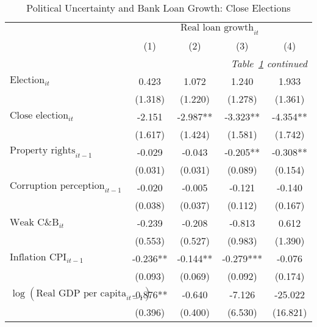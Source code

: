 \begin{longtable}{m{8cm}*{4}{c}}                                         \caption{Political Uncertainty and Bank Loan Growth: Close Elections \label{celoans}}\\                                         \toprule                                         &\multicolumn{4}{c}{$\text{Real loan growth}_{it}$} \\ \cmidrule(lr){2-5}
                    &         (1)   &         (2)   &         (3)   &         (4)   \\
\midrule\endfirsthead                                         \multicolumn{5}{r}{\textit{Table~\ref{celoans} continued}} \\                                         \toprule\endhead\midrule\endfoot\endlastfoot
$\text{Election}_{it}$&       0.423   &       1.072   &       1.240   &       1.933   \\
                    &     (1.318)   &     (1.220)   &     (1.278)   &     (1.361)   \\
$\text{Close election}_{it}$&      -2.151   &      -2.987** &      -3.323** &      -4.354** \\
                    &     (1.617)   &     (1.424)   &     (1.581)   &     (1.742)   \\
$\text{Property rights}_{it-1}$&      -0.029   &      -0.043   &      -0.205** &      -0.308** \\
                    &     (0.031)   &     (0.031)   &     (0.089)   &     (0.154)   \\
$\text{Corruption perception}_{it-1}$&      -0.020   &      -0.005   &      -0.121   &      -0.140   \\
                    &     (0.038)   &     (0.037)   &     (0.112)   &     (0.167)   \\
$\text{Weak C\&B}_{it}$&      -0.239   &      -0.208   &      -0.813   &       0.612   \\
                    &     (0.553)   &     (0.527)   &     (0.983)   &     (1.390)   \\
$\text{Inflation CPI}_{it-1}$&      -0.236** &      -0.144** &      -0.279***&      -0.076   \\
                    &     (0.093)   &     (0.069)   &     (0.092)   &     (0.174)   \\
$\log(\text{Real GDP per capita}_{it-1})$&      -0.876** &      -0.640   &      -7.126   &     -25.022   \\
                    &     (0.396)   &     (0.400)   &     (6.530)   &    (16.821)   \\

\end{longtable}

